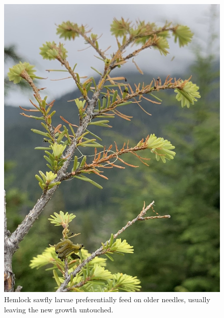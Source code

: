 \begin{figure}[H]
\begin{center}
\vspace{4mm}
\includegraphics[width=\textwidth]{img/hemlock_sawfly_wasteful_feeder.jpg}
\caption{Hemlock sawfly larvae preferentially feed on older needles, usually leaving the new growth untouched.}
\label{hemlock_sawfly_wasteful_feeder}
\end{center}
\end{figure} 


